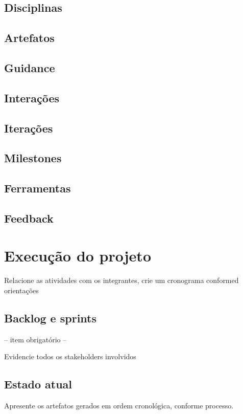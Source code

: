 \documentclass[	DIV=calc,%
							paper=a4,%
							fontsize=12pt,%
							onecolumn]{scrartcl}	 					%
\begin{document}
\subsection{Disciplinas}

\subsection{Artefatos}

\subsection{Guidance}

\subsection{Interações}

\subsection{Iterações}

\subsection{Milestones}

\subsection{Ferramentas}

\subsection{Feedback}

\section{Execução do projeto}

Relacione as atividades com os integrantes, crie um cronograma conformed orientações
\subsection{Backlog e sprints}
-- item obrigatório --

Evidencie todos os stakeholders involvidos


\subsection{Estado atual}
Apresente os artefatos gerados em ordem cronológica, conforme processo.
\end{document}

